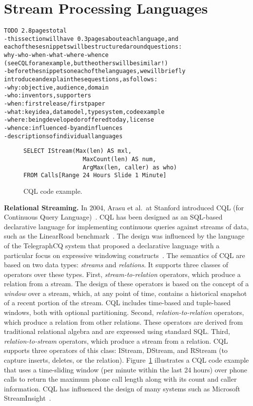 \section{Stream Processing Languages}\label{sec:languages}

\begin{alltt}TODO\scriptsize ~2.8 pages total
- this section will have ~0.3 pages about each language, and
  each of these snippets will be structured around questions:
  why-who-when-what-where-whence
  (see CQL for an example, but the others will be similar!)
- before the snippets on each of the languages, we will briefly
  introduce and explain these questions, as follows:
  - why: objective, audience, domain
  - who: inventors, supporters
  - when: first release / first paper
  - what: key idea, data model, type system, code example
  - where: being developed or offered today, license
  - whence: influenced-by and influences
- descriptions of individual languages
\end{alltt}

\begin{figure}[!h]
\begin{lstlisting}
SELECT IStream(Max(len) AS mxl,
                 MaxCount(len) AS num,
                 ArgMax(len, caller) as who)
FROM Calls[Range 24 Hours Slide 1 Minute]
\end{lstlisting}
\vspace*{-4mm}
\caption{\label{fig:cql}CQL code example.}
\end{figure}

\textbf{Relational Streaming.}
In 2004, Arasu et al.\ at Stanford introduced CQL (for Continuous
Query Language)~\cite{arasu_widom_2004}. CQL has been designed as an
SQL-based declarative language for implementing continuous queries
against streams of data, such as the LinearRoad
benchmark~\cite{arasu_et_al_2004}. The design was influenced by the language of
the TelegraphCQ system that proposed a declarative language with a
particular focus on expressive windowing
constructs~\cite{chandrasekaran_et_al_2003}. The semantics of CQL are
based on two data types: \emph{streams} and \emph{relations}. It
supports three classes of operators over these types. First,
\emph{stream-to-relation} operators, which produce a relation from a
stream.  The design of these operators is based on the concept of a
\emph{window} over a stream, which, at any point of time, contains a
historical snapshot of a recent portion of the stream. CQL includes
time-based and tuple-based windows, both with optional
partitioning. Second, \emph{relation-to-relation} operators, which
produce a relation from other relations. These operators are derived
from traditional relational algebra and are expressed using standard
SQL. Third, \emph{relation-to-stream} operators, which produce a
stream from a relation. CQL supports three operators of this class:
IStream, DStream, and RStream (to capture inserts, deletes, or the
relation).  Figure~\ref{fig:cql} illustrates a CQL code example that
uses a time-sliding window (per minute within the last 24 hours) over
phone calls to return the maximum phone call length along with its
count and caller information. CQL has influenced the design of many
systems such as Microsoft StreamInsight~\cite{ali_et_al_2009}.


